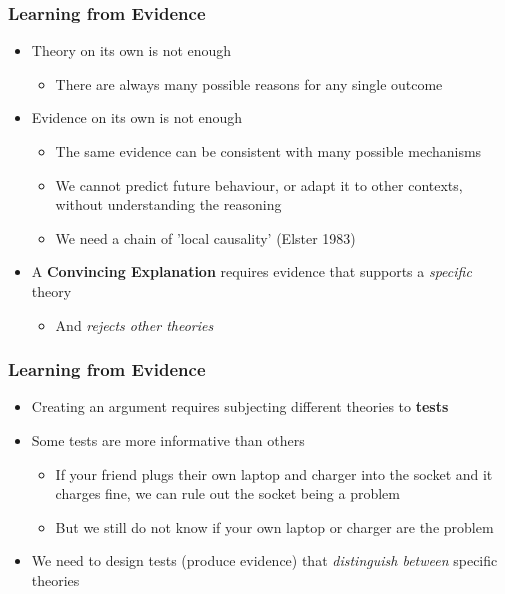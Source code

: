 \documentclass[xcolor=x11names,compress]{beamer}\usepackage[]{graphicx}\usepackage[]{xcolor}
\renewcommand{\(}{\begin{columns}}
\renewcommand{\)}{\end{columns}}
\newcommand{\<}[1]{\begin{column}{#1}}
\renewcommand{\>}{\end{column}}
\begin{document}
\begin{frame}
\frametitle{Learning from Evidence}
\begin{itemize}
\item Theory on its own is not enough
\begin{itemize}
\item There are always many possible reasons for any single outcome
\pause
\end{itemize}
\item Evidence on its own is not enough
\begin{itemize}
\item The same evidence can be consistent with many possible mechanisms
\item We cannot predict future behaviour, or adapt it to other contexts, without understanding the reasoning
\item We need a chain of 'local causality' (Elster 1983)
\pause
\end{itemize}
\item A \textbf{Convincing Explanation} requires evidence that supports a \textit{specific} theory
\begin{itemize}
\item And \textit{rejects other theories}
\end{itemize}
\end{itemize}
\end{frame}

\begin{frame}
\frametitle{Learning from Evidence}
\begin{itemize}
\item Creating an argument requires subjecting different theories to \textbf{tests}
\pause
\item Some tests are more informative than others
\pause
\begin{itemize}
\item If your friend plugs their own laptop and charger into the socket and it charges fine, we can rule out the socket being a problem
\pause
\item But we still do not know if your own laptop or charger are the problem
\pause
\end{itemize}
\item We need to design tests (produce evidence) that \textit{distinguish between} specific theories
\end{itemize}
\end{frame}
\end{document}
